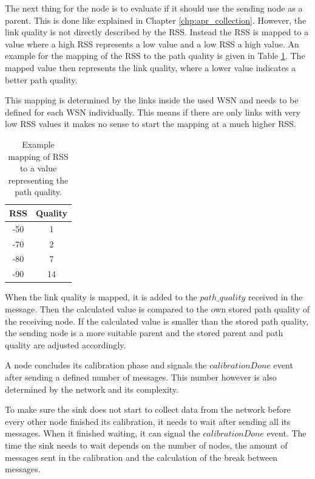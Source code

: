 The next thing for the node is to evaluate if it should use the sending node as a parent. This is done like explained in Chapter \ref{chp:apr_collection}. However, the link quality is not directly described by the RSS. Instead the RSS is mapped to a value where a high RSS represents a low value and a low RSS a high value. An example for the mapping of the RSS to the path quality is given in Table \ref{tab:mappingRSSI}. The mapped value then represents the link quality, where a lower value indicates a better path quality.

This mapping is determined by the links inside the used WSN and needs to be defined for each WSN individually. This means if there are only links with very low RSS values it makes no sense to start the mapping at a much higher RSS.

\begin{table}[htbp]
 \caption{Example mapping of RSS to a value representing the path quality.}
 \centering
 \begin{tabular}{c|c}
  RSS & Quality\\ \toprule
  -50 & 1 \\
  -70 & 2 \\
  -80 & 7 \\
  -90 & 14 \\
 \end{tabular}
 \label{tab:mappingRSSI}
\end{table}

When the link quality is mapped, it is added to the $path\_quality$ received in the message. Then the calculated value is compared to the own stored path quality of the receiving node. If the calculated value is smaller than the stored path quality, the sending node is a more suitable parent and the stored parent and path quality are adjusted accordingly.   

A node concludes its calibration phase and signals the $calibrationDone$ event after sending a defined number of messages. This number however is also determined by the network and its complexity.  

To make sure the sink does not start to collect data from the network before every other node finished its calibration, it needs to wait after sending all its messages.
When it finished waiting, it can signal the $calibrationDone$ event. The time the sink needs to wait depends on the number of nodes, the amount of messages sent in the calibration and the calculation of the break between messages.
 
